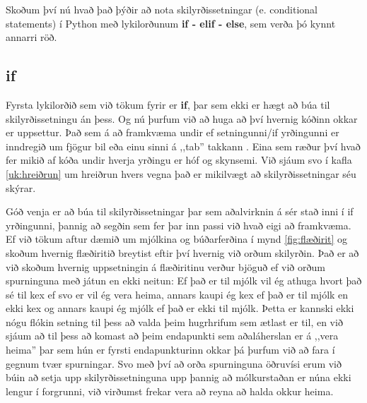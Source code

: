 Skoðum því nú hvað það þýðir að nota skilyrðissetningar (e. conditional statements) í Python með lykilorðunum \textbf{if - elif - else}, sem verða þó kynnt annarri röð.

\subsection{if}
Fyrsta lykilorðið sem við tökum fyrir er \textbf{if}, þar sem ekki er hægt að búa til skilyrðissetningu án þess.
Og nú þurfum við að huga að því hvernig kóðinn okkar er uppsettur.
Það sem á að framkvæma undir ef setningunni/if yrðingunni er inndregið um fjögur bil eða einu sinni á ,,tab'' takkann .
Eina sem ræður því hvað fer mikið af kóða undir hverja yrðingu er hóf og skynsemi.
Við sjáum svo í kafla \ref{uk:hreiðrun} um hreiðrun hvers vegna það er mikilvægt að skilyrðissetningar séu skýrar.

Góð venja er að búa til skilyrðissetningar þar sem aðalvirknin á sér stað inni í if yrðingunni, þannig að segðin sem fer þar inn passi við hvað eigi að framkvæma.
Ef við tökum aftur dæmið um mjólkina og búðarferðina í mynd \ref{fig:flæðirit} og skoðum hvernig flæðiritið breytist eftir því hvernig við orðum skilyrðin.
Það er að við skoðum hvernig uppsetningin á flæðiritinu verður bjöguð ef við orðum spurninguna með játun en ekki neitun: Ef það er til mjólk vil ég athuga hvort það sé til kex ef svo er vil ég vera heima, annars kaupi ég kex ef það er til mjólk en ekki kex og annars kaupi ég mjólk ef það er ekki til mjólk.
Þetta er kannski ekki nógu flókin setning til þess að valda þeim hugrhrifum sem ætlast er til, en við sjáum að til þess að komast að þeim endapunkti sem aðaláherslan er á ,,vera heima'' þar sem hún er fyrsti endapunkturinn okkar þá þurfum við að fara í gegnum tvær spurningar.
Svo með því að orða spurninguna öðruvísi erum við búin að setja upp skilyrðissetninguna upp þannig að mólkurstaðan er núna ekki lengur í forgrunni, við virðumst frekar vera að reyna að halda okkur heima.

